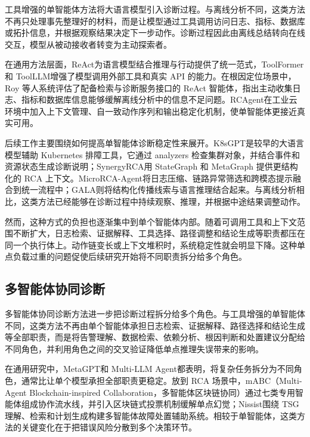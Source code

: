 工具增强的单智能体方法将大语言模型引入诊断过程。与离线分析不同，这类方法不再只处理事先整理好的材料，而是让模型通过工具调用访问日志、指标、数据库或拓扑信息，并根据观察结果决定下一步动作。诊断过程因此由离线总结转向在线交互，模型从被动接收者转变为主动探索者。

在通用方法层面，ReAct\cite{yao2022react}为语言模型结合推理与行动提供了统一范式，ToolFormer 和 ToolLLM\cite{schick2024toolformer,qin2023toolllm}增强了模型调用外部工具和真实 API 的能力。在根因定位场景中，Roy 等人\cite{roy2024exploringllmrca}系统评估了配备检索与诊断服务接口的 ReAct 智能体，指出主动收集日志、指标和数据库信息能够缓解离线分析中的信息不足问题。RCAgent\cite{wang2024rcagent}在工业云环境中加入上下文管理、自一致动作序列和输出稳定化机制，使单智能体更接近真实可用。

后续工作主要围绕如何提高单智能体诊断稳定性来展开。K8sGPT\cite{k8sgpt2023}是较早的大语言模型辅助 Kubernetes 排障工具，它通过 analyzers 检查集群对象，并结合事件和资源状态生成诊断说明；SynergyRCA\cite{xiang2025synergyrca}用 StateGraph 和 MetaGraph 提供更结构化的 RCA 上下文。MicroRCA-Agent\cite{tang2025microrcaagent}将日志压缩、链路异常筛选和跨模态提示融合到统一流程中；GALA\cite{tian2025gala}则将结构化传播线索与语言推理结合起来。与离线分析相比，这类方法已经能够在诊断过程中持续观察、推理，并根据中途结果调整动作。

然而，这种方式的负担也逐渐集中到单个智能体内部。随着可调用工具和上下文范围不断扩大，日志检索、证据解释、工具选择、路径调整和结论生成等职责都压在同一个执行体上。动作链变长或上下文堆积时，系统稳定性就会明显下降\cite{roy2024exploringllmrca,wang2024rcagent,xiang2025synergyrca,tang2025microrcaagent}。这种单点负载过重的问题促使后续研究开始将不同职责拆分给多个角色。

\subsection{多智能体协同诊断}

多智能体协同诊断方法进一步把诊断过程拆分给多个角色。与工具增强的单智能体不同，这类方法不再由单个智能体承担日志检索、证据解释、路径选择和结论生成等全部职责，而是将告警理解、数据检索、依赖分析、根因判断和处置建议分配给不同角色，并利用角色之间的交叉验证降低单点推理失误带来的影响。

在通用研究中，MetaGPT\cite{hong2023metagpt}和 Multi-LLM Agent\cite{small-llm-agents}都表明，将复杂任务拆分为不同角色，通常比让单个模型承担全部职责更稳定。放到 RCA 场景中，mABC（Multi-Agent Blockchain-inspired Collaboration，多智能体区块链协同）\cite{zhang2024mabc}通过七类专用智能体组成协作流水线，并引入区块链式投票机制缓解单点幻觉；Nissist\cite{an2024nissist}围绕 TSG 理解、检索和计划生成构建多智能体故障处置辅助系统。相较于单智能体，这类方法的关键变化在于把错误风险分散到多个决策环节。

